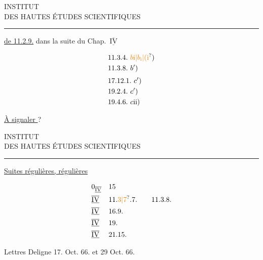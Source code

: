 
\begin{center}
INSTITUT\\
DES HAUTES ÉTUDES SCIENTIFIQUES\\
\rule{1.4cm}{0.4pt}
\end{center}

\uline{ de 11.2.9.} dans la suite du Chap.~$\overline{\underline{\mathrm{IV}}}$

\[
\begin{aligned}
&11.3.4.\ \unsure{b\mathrm{i}|b_{\mathrm{i}}|(\mathrm{i}})\\
&11.3.8.\ b')\\[3pt]
&17.12.1.\ c')\\
&19.2.4.\ c')\\
&19.4.6.\ c\mathrm{ii})
\end{aligned}
\]

\uline{À signaler } \uline{} ?

\begin{center}
INSTITUT\\
DES HAUTES ÉTUDES SCIENTIFIQUES\\
\rule{1.4cm}{0.4pt}
\end{center}

\uline{Suites régulières,  régulières}

\[
\begin{aligned}
&0_{\overline{\underline{\mathrm{IV}}}} &&15\\
&\overline{\underline{\mathrm{IV}}} &&11.\unsure{3|7}.7.\qquad 11.3.8.\\
&\overline{\underline{\mathrm{IV}}} &&16.9.\\
&\overline{\underline{\mathrm{IV}}} &&19.\\
&\overline{\underline{\mathrm{IV}}} &&21.15.
\end{aligned}
\]

Lettres Deligne 17. Oct. 66. et 29 Oct. 66.


